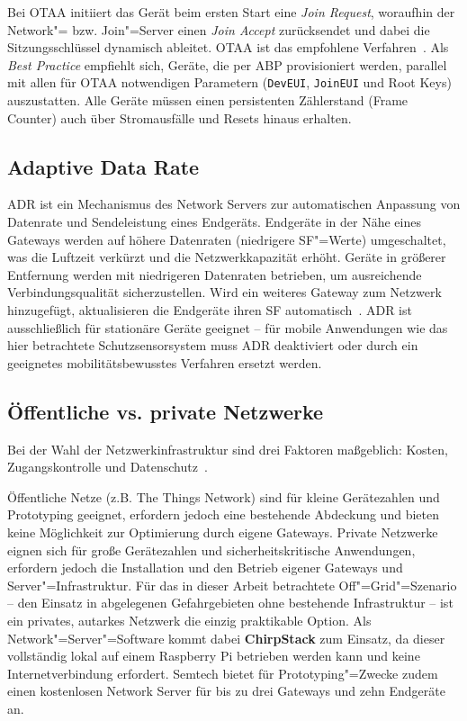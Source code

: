 Bei \ac{OTAA} initiiert das Gerät beim ersten Start eine \textit{Join Request},
woraufhin der Network"= bzw. Join"=Server einen \textit{Join Accept} zurücksendet
und dabei die Sitzungsschlüssel dynamisch ableitet. \ac{OTAA} ist das empfohlene
Verfahren~\cite{lorawan_spec}. Als \textit{Best Practice} empfiehlt sich, Geräte,
die per ABP provisioniert werden, parallel mit allen für OTAA notwendigen Parametern
(\texttt{DevEUI}, \texttt{JoinEUI} und Root Keys) auszustatten. Alle Geräte müssen
einen persistenten Zählerstand (Frame Counter) auch über Stromausfälle und Resets
hinaus erhalten.

\subsection{Adaptive Data Rate}
\label{subsec:adr}

\ac{ADR} ist ein Mechanismus des Network Servers zur automatischen Anpassung von
Datenrate und Sendeleistung eines Endgeräts. Endgeräte in der Nähe eines Gateways
werden auf höhere Datenraten (niedrigere SF"=Werte) umgeschaltet, was die Luftzeit
verkürzt und die Netzwerkkapazität erhöht. Geräte in größerer Entfernung werden mit
niedrigeren Datenraten betrieben, um ausreichende Verbindungsqualität sicherzustellen.
Wird ein weiteres Gateway zum Netzwerk hinzugefügt, aktualisieren die Endgeräte ihren
SF automatisch~\cite{semtech_lora_basics}. \ac{ADR} ist ausschließlich für stationäre
Geräte geeignet -- für mobile Anwendungen wie das hier betrachtete Schutzsensorsystem
muss ADR deaktiviert oder durch ein geeignetes mobilitätsbewusstes Verfahren ersetzt
werden.

\subsection{Öffentliche vs. private Netzwerke}
\label{subsec:netzwerktypen}

Bei der Wahl der Netzwerkinfrastruktur sind drei Faktoren maßgeblich: Kosten,
Zugangskontrolle und Datenschutz~\cite{semtech_lora_basics}.

Öffentliche Netze (z.B. The Things Network) sind für kleine Gerätezahlen und
Prototyping geeignet, erfordern jedoch eine bestehende Abdeckung und bieten keine
Möglichkeit zur Optimierung durch eigene Gateways. Private Netzwerke eignen sich
für große Gerätezahlen und sicherheitskritische Anwendungen, erfordern jedoch die
Installation und den Betrieb eigener Gateways und Server"=Infrastruktur. Für das
in dieser Arbeit betrachtete Off"=Grid"=Szenario -- den Einsatz in abgelegenen
Gefahrgebieten ohne bestehende Infrastruktur -- ist ein privates, autarkes Netzwerk
die einzig praktikable Option. Als Network"=Server"=Software kommt dabei \textbf{ChirpStack}
zum Einsatz, da dieser vollständig lokal auf einem Raspberry Pi betrieben werden kann
und keine Internetverbindung erfordert. Semtech bietet für Prototyping"=Zwecke zudem
einen kostenlosen Network Server für bis zu drei Gateways und zehn Endgeräte an.


